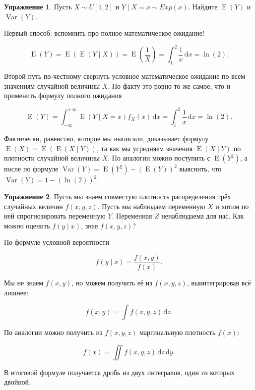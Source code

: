 \documentclass[12pt, a4paper, oneside]{extreport}
\DeclareMathOperator{\Var}{Var}
\DeclareMathOperator{\E}{\mathop{E}}
\newcommand{\dx}[1]{\,\mathrm{d}#1} %
\theoremstyle{plain}              %
\theoremstyle{definition}         %
\newtheorem{problem}{\color{myblue} Упражнение}
\begin{document}
\begin{problem}
Пусть $X \sim U[1,2]$ и  $Y \mid X=x \sim Exp(x)$. Найдите $\E(Y)$ и $\Var(Y)$. 

\begin{sol} 
Первый способ: вспомнить про полное математическое ожидание! 

\[ \E(Y) = \E(\E(Y \mid X)) = \E\left(\frac{1}{X}\right) = \int_1^2 \frac{1}{x} \dx{x} = \ln(2). \]

Второй путь по-честному свернуть условное математическое ожидание по всем значениям случайной величины $X$. По факту это ровно то же самое, что и применить формулу полного ожидания

\[ \E(Y) = \int_{-\infty}^{+\infty} \E(Y \mid X = x) f_X(x) \dx{x} = \int_1^2 \frac{1}{x} \dx{x} = \ln(2).\]

Фактически, равенство,  которое мы выписали, доказывает формулу $\E(X) = \E(\E(X \mid Y))$, та как мы усредняем значения $\E(X \mid Y)$ по плотности случайной величины $X$. По аналогии можно поступить с $\E(Y^2)$, а после по формуле $\Var(Y) = \E(Y^2) - (\E(Y))^2$ выяснить, что $\Var(Y) = 1 - (\ln(2))^2$.
\end{sol} 
\end{problem}


\begin{problem} 
Пусть мы знаем совместую плотность распределения трёх случайных величин  $f(x,y,z)$.  Пусть мы наблюдаем переменную $X$ и хотим по ней спрогнозировать переменную $Y$. Переменная $Z$ ненаблюдаема для нас. Как можно оценить $f(y \mid x)$, зная $f(x,y,z)$? 

\begin{sol}
По формуле условной вероятности 

\[f(y \mid x) = \frac{f(x,y)}{f(x)}.\]

Мы не знаем $f(x,y)$, но можем получить её из $f(x,y,z)$, выинтегрировав всё лишнее: 

\[ f(x,y) = \int f(x,y,z) \dx{z}. \]

По аналогии можно получить из $f(x,y,z)$ маргинальную плотность $f(x)$: 

\[ f(x) = \iint f(x,y,z) \dx{z}\dx{y}. \]

В итоговой формуле получается дробь из двух интегралов, один из которых двойной.  
\end{sol}
\end{problem}
\end{document}

